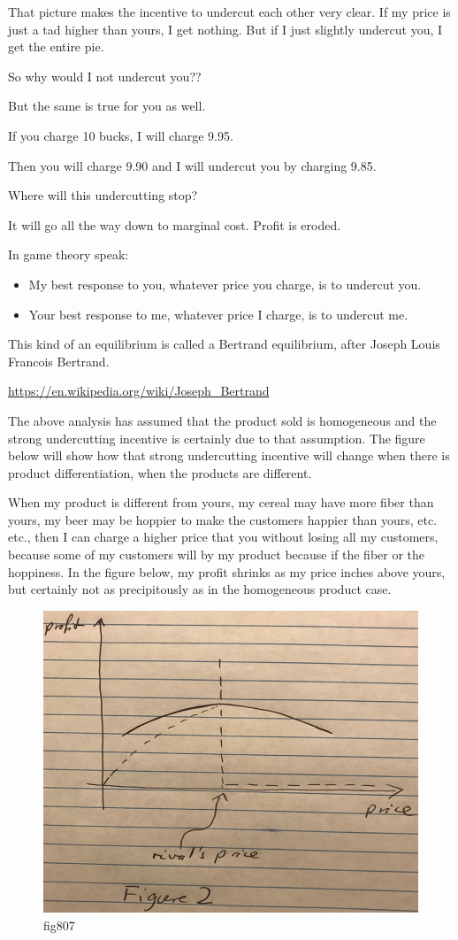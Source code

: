 \documentclass[
]{book}
\providecommand{\tightlist}{%
  \setlength{\itemsep}{0pt}\setlength{\parskip}{0pt}}
\begin{document}
That picture makes the incentive to undercut each other very clear. If my price is just a tad higher than yours, I get nothing. But if I just slightly undercut you, I get the entire pie.

So why would I not undercut you??

But the same is true for you as well.

If you charge 10 bucks, I will charge 9.95.

Then you will charge 9.90 and I will undercut you by charging 9.85.

Where will this undercutting stop?

It will go all the way down to marginal cost. Profit is eroded.

In game theory speak:

\begin{itemize}
\tightlist
\item
  My best response to you, whatever price you charge, is to undercut you.
\item
  Your best response to me, whatever price I charge, is to undercut me.
\end{itemize}

This kind of an equilibrium is called a Bertrand equilibrium, after Joseph Louis Francois Bertrand.

\url{https://en.wikipedia.org/wiki/Joseph_Bertrand}

The above analysis has assumed that the product sold is homogeneous and the strong undercutting incentive is certainly due to that assumption. The figure below will show how that strong undercutting incentive will change when there is product differentiation, when the products are different.

When my product is different from yours, my cereal may have more fiber than yours, my beer may be hoppier to make the customers happier than yours, etc. etc., then I can charge a higher price that you without losing all my customers, because some of my customers will by my product because if the fiber or the hoppiness. In the figure below, my profit shrinks as my price inches above yours, but certainly not as precipitously as in the homogeneous product case.

\begin{figure}

{\centering \includegraphics[width=0.5\linewidth]{img/ch8/fig7} 

}

\caption{fig807}\label{fig:fig807}
\end{figure}
\end{document}
